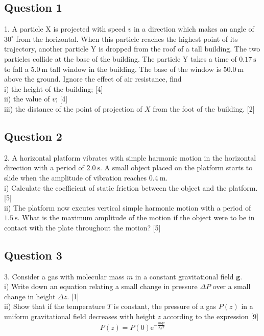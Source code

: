 \documentclass{article}
\begin{document}
\subsection{Question 1}
1. A particle $\mathrm{X}$ is projected with speed $v$ in a direction which makes an angle of $30^{\circ}$ from the horizontal. When this particle reaches the highest point of its trajectory, another particle $\mathrm{Y}$ is dropped from the roof of a tall building. The two particles collide at the base of the building. The particle $\mathrm{Y}$ takes a time of $0.17 \mathrm{~s}$ to fall a $5.0 \mathrm{~m}$ tall window in the building. The base of the window is $50.0 \mathrm{~m}$ above the ground. Ignore the effect of air resistance, find \\
i) the height of the building; [4] \\
ii) the value of $v$; [4] \\
iii) the distance of the point of projection of $X$ from the foot of the building. [2]

\subsection{Question 2}
2. A horizontal platform vibrates with simple harmonic motion in the horizontal direction with a period of $2.0 \mathrm{~s}$. A small object placed on the platform starts to slide when the amplitude of vibration reaches $0.4 \mathrm{~m}$. \\
i) Calculate the coefficient of static friction between the object and the platform. [5] \\
ii) The platform now excutes vertical simple harmonic motion with a period of $1.5 \mathrm{~s}$. What is the maximum amplitude of the motion if the object were to be in contact with the plate throughout the motion? [5]

\subsection{Question 3}
3. Consider a gas with molecular mass $m$ in a constant gravitational field $\mathbf{g}$. \\
i) Write down an equation relating a small change in pressure $\Delta P$ over a small change in height $\Delta z$. [1] \\
ii) Show that if the temperature $T$ is constant, the pressure of a gas $P(z)$ in a uniform gravitational field decreases with height $z$ according to the expression [9]
$$
P(z)=P(0) \mathrm{e}^{-\frac{m g z}{k_{B} T}}
$$
\end{document}
